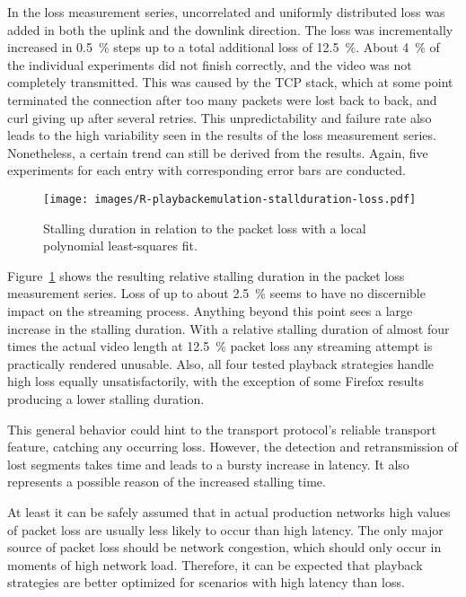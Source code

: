 In the loss measurement series, uncorrelated and uniformly distributed loss was added in both the uplink and the downlink direction. The loss was incrementally increased in \SI{0.5}{\percent} steps up to a total additional loss of \SI{12.5}{\percent}. About \SI{4}{\percent} of the individual experiments did not finish correctly, and the video was not completely transmitted. This was caused by the \gls{TCP} stack, which at some point terminated the connection after too many packets were lost back to back, and curl giving up after several retries. This unpredictability and failure rate also leads to the high variability seen in the results of the loss measurement series. Nonetheless, a certain trend can still be derived from the results. Again, five experiments for each entry with corresponding error bars are conducted.


\begin{figure}[htbp]
	\centering
	\texttt{[image: images/R-playbackemulation-stallduration-loss.pdf]}
	\caption{Stalling duration in relation to the packet loss with a local polynomial least-squares fit.}
\label{c3:fig:eval-loss-stallingtime}
\end{figure}

Figure~\ref{c3:fig:eval-loss-stallingtime} shows the resulting relative stalling duration in the packet loss measurement series. Loss of up to about \SI{2.5}{\percent} seems to have no discernible impact on the streaming process. Anything beyond this point sees a large increase in the stalling duration. With a relative stalling duration of almost four times the actual video length at \SI{12.5}{\percent} packet loss any streaming attempt is practically rendered unusable. Also, all four tested playback strategies handle high loss equally unsatisfactorily, with the exception of some Firefox results producing a lower stalling duration.

This general behavior could hint to 
the transport protocol's reliable transport feature, catching any occurring loss. However, the detection and retransmission of lost segments takes time and leads to a bursty increase in latency. It also represents a possible reason of the increased stalling time. 

At least it can be safely assumed that in actual production networks high values of packet loss are usually less likely to occur than high latency. 
The only major source of packet loss should be network congestion, which should only occur in moments of high network load. Therefore, it can be expected that playback strategies are better optimized for scenarios with high latency than loss.

